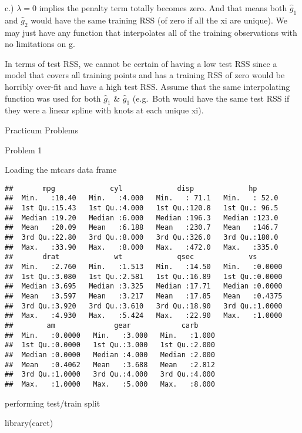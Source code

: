 \documentclass[
]{article}
\newenvironment{Shaded}{\begin{snugshade}}{\end{snugshade}}
\newcommand{\FunctionTok}[1]{\textcolor[rgb]{0.00,0.00,0.00}{#1}}
\newcommand{\NormalTok}[1]{#1}
\begin{document}
c.) \(\lambda=0\) implies the penalty term totally becomes zero. And
that means both \(\hat{g}_1\) and \(\hat{g}_2\) would have the same
training RSS (of zero if all the xi are unique). We may just have any
function that interpolates all of the training observations with no
limitations on g.

In terms of test RSS, we cannot be certain of having a low test RSS
since a model that covers all training points and has a training RSS of
zero would be horribly over-fit and have a high test RSS. Assume that
the same interpolating function was used for both \(\hat{g}_1\) \&
\(\hat{g}_1\) (e.g.~Both would have the same test RSS if they were a
linear spline with knots at each unique xi).

Practicum Problems

Problem 1

Loading the mtcars data frame

\begin{verbatim}
##       mpg             cyl             disp             hp       
##  Min.   :10.40   Min.   :4.000   Min.   : 71.1   Min.   : 52.0  
##  1st Qu.:15.43   1st Qu.:4.000   1st Qu.:120.8   1st Qu.: 96.5  
##  Median :19.20   Median :6.000   Median :196.3   Median :123.0  
##  Mean   :20.09   Mean   :6.188   Mean   :230.7   Mean   :146.7  
##  3rd Qu.:22.80   3rd Qu.:8.000   3rd Qu.:326.0   3rd Qu.:180.0  
##  Max.   :33.90   Max.   :8.000   Max.   :472.0   Max.   :335.0  
##       drat             wt             qsec             vs        
##  Min.   :2.760   Min.   :1.513   Min.   :14.50   Min.   :0.0000  
##  1st Qu.:3.080   1st Qu.:2.581   1st Qu.:16.89   1st Qu.:0.0000  
##  Median :3.695   Median :3.325   Median :17.71   Median :0.0000  
##  Mean   :3.597   Mean   :3.217   Mean   :17.85   Mean   :0.4375  
##  3rd Qu.:3.920   3rd Qu.:3.610   3rd Qu.:18.90   3rd Qu.:1.0000  
##  Max.   :4.930   Max.   :5.424   Max.   :22.90   Max.   :1.0000  
##        am              gear            carb      
##  Min.   :0.0000   Min.   :3.000   Min.   :1.000  
##  1st Qu.:0.0000   1st Qu.:3.000   1st Qu.:2.000  
##  Median :0.0000   Median :4.000   Median :2.000  
##  Mean   :0.4062   Mean   :3.688   Mean   :2.812  
##  3rd Qu.:1.0000   3rd Qu.:4.000   3rd Qu.:4.000  
##  Max.   :1.0000   Max.   :5.000   Max.   :8.000
\end{verbatim}

performing test/train split

\begin{Shaded}
\begin{Highlighting}[]
\FunctionTok{library}\NormalTok{(caret)}
\end{Highlighting}
\end{Shaded}
\end{document}
